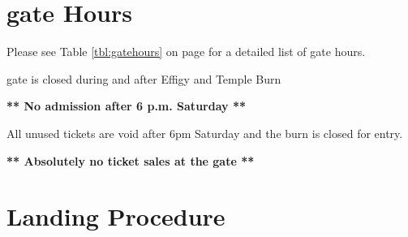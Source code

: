 \section*{\Gls{gate} Hours}
\label{sec:gate}

Please see Table \ref{tbl:gatehours} on page \pageref{tbl:gatehours} for a detailed list of gate hours.

\Gls{gate} is closed during and after Effigy and Temple Burn

\textbf{** No admission after 6 p.m. Saturday **}
 
All unused tickets are void after 6pm Saturday and the burn is closed for entry. 

\textbf{** Absolutely no ticket sales at the gate **}


\section*{Landing Procedure}
\label{sec:parking}


